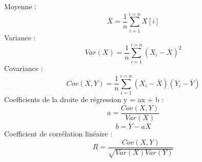 
Moyenne :
\[
\overline{X} = \frac{1}{n} \sum_{i = 1}^{i = n} X[i]
\]
Variance :
\[
Var(X) = \frac{1}{n}  \sum_{i = 1}^{i = n} {(X_i - \overline{X})}^2
\]
Covariance :
\[
Cov(X,Y) = \frac{1}{n}  \sum_{i = 1}^{i = n} (X_i - \overline{X})(Y_i - \overline{Y})
\]
Coefficients de la droite de r\'egression y = ax + b :
\[
a = \frac{Cov(X,Y)}{Var(X)}
\]
\[
b = \overline{Y} - a\overline{X}
\]
Coefficient de corr\'elation lin\'eaire :
\[
R = \frac{Cov(X,Y)}{\sqrt{Var(X)Var(Y)}}
\]

